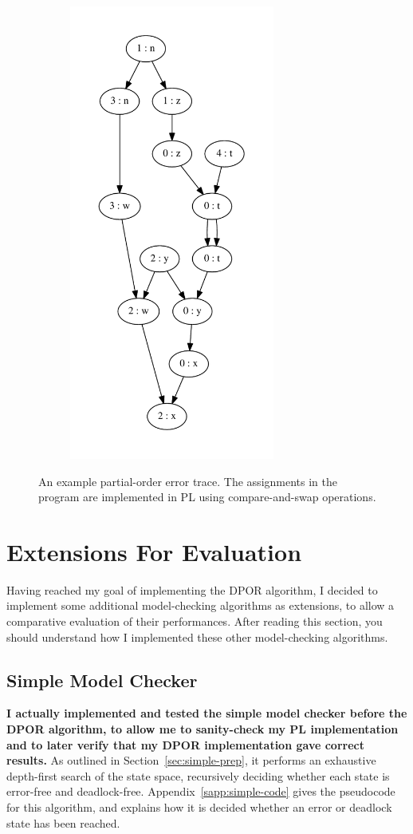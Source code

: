 \documentclass[12pt,a4paper,twoside,openright]{report}
\begin{document}
\begin{figure}
\begin{subfigure}{0.5\textwidth}
		\includegraphics[height=15cm]{error_trace}
	\end{subfigure}
	\caption[An example partial-order
	error trace.]{An example partial-order
		error trace. The assignments in
		the program are implemented in PL
		using compare-and-swap operations.}
	\label{fig:trace-example}
\end{figure}

\section{Extensions For Evaluation}
Having reached my goal of implementing
the DPOR algorithm, I decided to
implement some additional model-checking
algorithms as extensions, to allow a
comparative evaluation of their
performances. After reading this
section, you should understand how
I implemented these other model-checking
algorithms.

\subsection{Simple Model Checker}
\label{sec:simple-imp}
\textbf{I actually implemented and tested
the simple
model checker before the DPOR
algorithm, to allow me to
sanity-check my PL implementation
and to later verify
that my DPOR implementation
gave correct results.}
As outlined in
Section~\ref{sec:simple-prep}, it
performs an exhaustive depth-first
search of the state space,
recursively deciding whether each
state is error-free
and deadlock-free.
Appendix~\ref{sapp:simple-code} gives
the pseudocode for this algorithm,
and explains how it is decided whether
an error or deadlock state has been reached.
\end{document}
